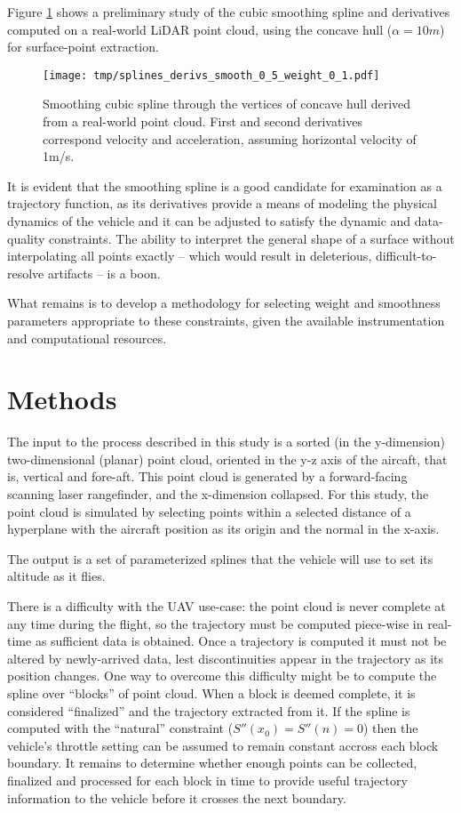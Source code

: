 \documentclass[doc]{apa6}
\begin{document}
Figure \ref{fig:cubic_derivatives} shows a preliminary study of the cubic smoothing spline and derivatives computed on a real-world LiDAR point cloud, using the concave hull ($\alpha = 10m$) for surface-point extraction.

\begin{figure} %
\texttt{[image: tmp/splines\_derivs\_smooth\_0\_5\_weight\_0\_1.pdf]} 
\caption{Smoothing cubic spline through the vertices of concave hull derived from a real-world point cloud. First and second derivatives correspond velocity and acceleration, assuming horizontal velocity of 1m/s.}
\label{fig:cubic_derivatives}
\end{figure}

It is evident that the smoothing spline is a good candidate for examination as a trajectory function, as its derivatives provide a means of modeling the physical dynamics of the vehicle and it can be adjusted to satisfy the dynamic and data-quality constraints. The ability to interpret the general shape of a surface without interpolating all points exactly -- which would result in deleterious, difficult-to-resolve artifacts -- is a boon.

What remains is to develop a methodology for selecting weight and smoothness parameters appropriate to these constraints, given the available instrumentation and computational resources.


\section{Methods}

The input to the process described in this study is a sorted (in the y-dimension) two-dimensional (planar) point cloud, oriented in the y-z axis of the aircaft, that is, vertical and fore-aft. This point cloud is generated by a forward-facing scanning laser rangefinder, and the x-dimension collapsed. For this study, the point cloud is simulated by selecting points within a selected distance of a hyperplane with the aircraft position as its origin and the normal in the x-axis. 

The output is a set of parameterized splines that the vehicle will use to set its altitude as it flies.

There is a difficulty with the UAV use-case: the point cloud is never complete at any time during the flight, so the trajectory must be computed piece-wise in real-time as sufficient data is obtained. Once a trajectory is computed it must not be altered by newly-arrived data, lest discontinuities appear in the trajectory as its position changes. One way to overcome this difficulty might be to compute the spline over ``blocks'' of point cloud. When a block is deemed complete, it is considered ``finalized'' and the trajectory extracted from it. If the spline is computed with the ``natural'' constraint ($S''(x_0) = S''(n) = 0$) then the vehicle's throttle setting can be assumed to remain constant accross each block boundary. It remains to determine whether enough points can be collected, finalized and processed for each block in time to provide useful trajectory information to the vehicle before it crosses the next boundary.
\end{document}
